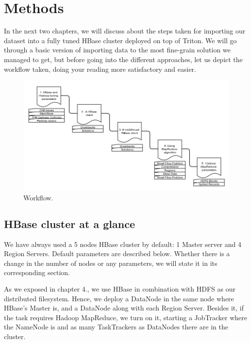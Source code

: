 \chapter{Methods}
\label{chapter:methods}



In the next two chapters, we will discuss about the steps taken for importing our dataset into a fully tuned HBase cluster deployed on top of Triton. We will go through a basic version of importing data to the most fine-grain solution we managed to get, but before going into the different approaches, let us depict the workflow taken, doing your reading more satisfactory and easier.


\bigskip
\begin{figure}[htb]
\centering
\includegraphics[width=1\textwidth]{./images/approaches.png}
\caption{Workflow.} \label{fig:approaches}
\end{figure}




\section{HBase cluster at a glance}

We have always used a 5 nodes HBase cluster by default: 1 Master server and 4 Region Servers. Default parameters are described below. Whether there is a change in the number of nodes or any parameters, we will state it in its corresponding section.
\par
As we exposed in chapter 4., we use HBase in combination with HDFS as our distributed filesystem. Hence, we deploy a DataNode in the same node where HBase's Master is, and a DataNode along with each Region Server. Besides it, if the task requires Hadoop MapReduce, we turn on it, starting a JobTracker where the NameNode is and as many TaskTrackers as DataNodes there are in the cluster.

